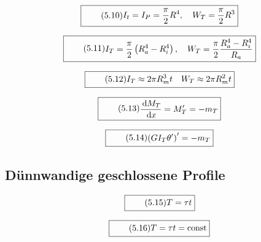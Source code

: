 \documentclass[11pt]{article}
\newcommand{\1}{ {\mathds{1}} }
\newcommand{\td}{\,\text{d}}
\begin{document}
\begin{multicols}{2}
		\begin{equation}
			\boxed{
				\tag{5.10}
				\begin{split}
					I_t = I_P = \frac{\pi}{2} R^4, \quad W_T = \frac{\pi}{2}R^3
				\end{split}
			}
		\end{equation}

		\begin{equation}
			\boxed{
				\tag{5.11}
				\begin{split}
					I_T = \frac{\pi}{2} \left( R^4_a - R^4_i \right), \quad W_T = \frac{\pi}{2}\frac{R^4_a -R_i^4}{R_a}
				\end{split}
			}
		\end{equation}

		\begin{equation}
			\boxed{
				\tag{5.12}
				\begin{split}
					I_T \approx 2 \pi R^3_m t \quad W_T \approx 2 \pi R^2_m t
				\end{split}
			}
		\end{equation}

		\begin{equation}
			\boxed{
				\tag{5.13}
				\begin{split}
					\frac{\td M_T}{\td x} = M'_T = -m_T
				\end{split}
			}
		\end{equation}

		\begin{equation}
			\boxed{
				\tag{5.14}
				\begin{split}
					\left( GI_T \theta' \right)' = -m_T
				\end{split}
			}
		\end{equation}

		\subsection{Dünnwandige geschlossene Profile}

		\begin{equation}
			\boxed{
				\tag{5.15}
				\begin{split}
					T = \tau t
				\end{split}
			}
		\end{equation}

		\begin{equation}
			\boxed{
				\tag{5.16}
				\begin{split}
					T = \tau t = \text{const}
				\end{split}
			}
		\end{equation}


\end{multicols}
\end{document}
